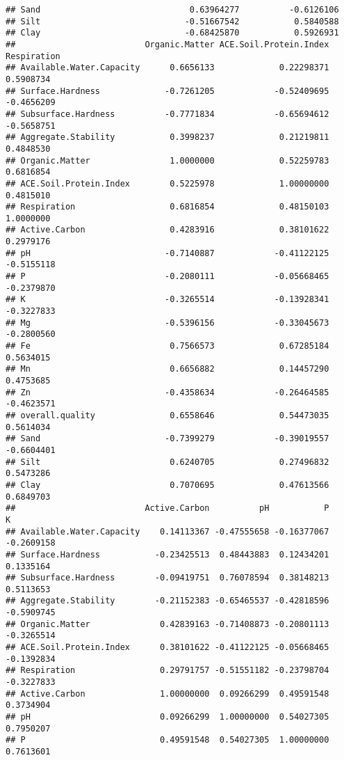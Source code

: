\documentclass[]{article}
\begin{document}
\begin{verbatim}
## Sand                              0.63964277          -0.6126106
## Silt                             -0.51667542           0.5840588
## Clay                             -0.68425870           0.5926931
##                          Organic.Matter ACE.Soil.Protein.Index Respiration
## Available.Water.Capacity      0.6656133             0.22298371   0.5908734
## Surface.Hardness             -0.7261205            -0.52409695  -0.4656209
## Subsurface.Hardness          -0.7771834            -0.65694612  -0.5658751
## Aggregate.Stability           0.3998237             0.21219811   0.4848530
## Organic.Matter                1.0000000             0.52259783   0.6816854
## ACE.Soil.Protein.Index        0.5225978             1.00000000   0.4815010
## Respiration                   0.6816854             0.48150103   1.0000000
## Active.Carbon                 0.4283916             0.38101622   0.2979176
## pH                           -0.7140887            -0.41122125  -0.5155118
## P                            -0.2080111            -0.05668465  -0.2379870
## K                            -0.3265514            -0.13928341  -0.3227833
## Mg                           -0.5396156            -0.33045673  -0.2800560
## Fe                            0.7566573             0.67285184   0.5634015
## Mn                            0.6656882             0.14457290   0.4753685
## Zn                           -0.4358634            -0.26464585  -0.4623571
## overall.quality               0.6558646             0.54473035   0.5614034
## Sand                         -0.7399279            -0.39019557  -0.6604401
## Silt                          0.6240705             0.27496832   0.5473286
## Clay                          0.7070695             0.47613566   0.6849703
##                          Active.Carbon          pH           P          K
## Available.Water.Capacity    0.14113367 -0.47555658 -0.16377067 -0.2609158
## Surface.Hardness           -0.23425513  0.48443883  0.12434201  0.1335164
## Subsurface.Hardness        -0.09419751  0.76078594  0.38148213  0.5113653
## Aggregate.Stability        -0.21152383 -0.65465537 -0.42818596 -0.5909745
## Organic.Matter              0.42839163 -0.71408873 -0.20801113 -0.3265514
## ACE.Soil.Protein.Index      0.38101622 -0.41122125 -0.05668465 -0.1392834
## Respiration                 0.29791757 -0.51551182 -0.23798704 -0.3227833
## Active.Carbon               1.00000000  0.09266299  0.49591548  0.3734904
## pH                          0.09266299  1.00000000  0.54027305  0.7950207
## P                           0.49591548  0.54027305  1.00000000  0.7613601

\end{verbatim}
\end{document}
